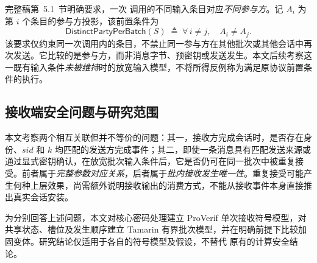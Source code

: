 完整稿第~5.1~节明确要求，一次 \batchreceive 调用的不同输入条目对应\emph{不同参与方}\cite{collins2024kwaayfull}。记 $A_i$ 为第 $i$ 个条目的参与方投影，该前置条件为
\begin{equation}
 \mathsf{DistinctPartyPerBatch}(S)\;\triangleq\;
 \forall\,i\ne j,\quad A_i\ne A_j.
 \label{eq:party-distinct}
\end{equation}
该要求仅约束同一次调用内的条目，不禁止同一参与方在其他批次或其他会话中再次发送。它比较的是参与方，而非消息字节、预密钥或发送发生。本文后续考察这一既有输入条件\emph{未被维持}时的放宽输入模型，不将所得反例称为满足原协议前置条件的执行。


\subsection{接收端安全问题与研究范围}
\label{subsec:receiver-research-questions}

本文考察两个相互关联但并不等价的问题：其一，接收方完成会话时，是否存在身份、$sid$ 和 $k$ 均匹配的发送方完成事件；其二，即使一条消息具有匹配发送来源或通过显式密钥确认，在放宽批次输入条件后，它是否仍可在同一批次中被重复接受。前者属于\emph{完整参数对应关系}，后者属于\emph{批内接收发生唯一性}。重复接受可能产生何种上层效果，尚需额外说明接收输出的消费方式，不能从接收事件本身直接推出真实会话安装。

为分别回答上述问题，本文对核心密码处理建立 ProVerif 单次接收符号模型，对共享状态、槽位及发生顺序建立 Tamarin 有界批次模型，并在明确前提下比较加固变体。研究结论仅适用于各自的符号模型及假设，不替代 \kwaay 原有的计算安全结论。
